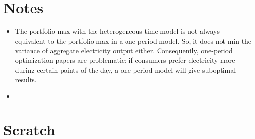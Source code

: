 \documentclass[12pt,a4paper]{extarticle}
\begin{document}
\section{Notes}

\begin{itemize}
	\item The portfolio max with the heterogeneous time model is not always equivalent to the portfolio max in a one-period model. So, it does not min the variance of aggregate electricity output either.  Consequently, one-period optimization papers are problematic; if consumers prefer electricity more during certain points of the day, a one-period model will give suboptimal results.
	\item 
\end{itemize}

\pagebreak


%
%
%	
%	
	
	
	
\pagebreak



\pagebreak

\section{Scratch}
\end{document}
